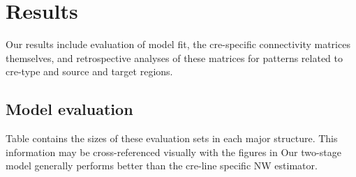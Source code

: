 \section{Results}

Our results include evaluation of model fit, the cre-specific connectivity matrices themselves, and retrospective analyses of these matrices for  patterns related to cre-type and source and target regions.

\subsection{Model evaluation}
\label{sec:model_eval}

Table  contains the sizes of these evaluation sets in each major structure.
This information may be cross-referenced visually with the figures in 
Our two-stage model generally performs better than the cre-line specific NW estimator.

